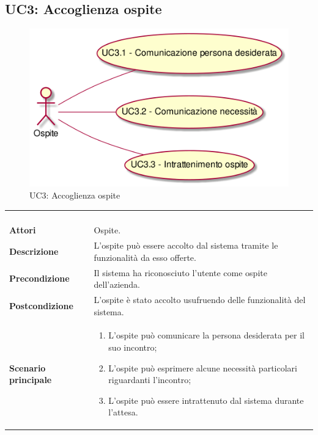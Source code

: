 \newpage\subsection{UC3: Accoglienza ospite}
\label{UC3}
\begin{figure}[h]
\centering
\includegraphics[width=\textwidth,height=\textheight,keepaspectratio]{images/UseCaseUC3.png}
\caption{UC3: Accoglienza ospite}
\end{figure}
\begin{longtable}{l|p{10cm}}
\rowcolor[gray]{0.8} \multicolumn{2}{c}{} \\
\rowcolor[gray]{0.8} \multicolumn{2}{c}{\textbf{UC3 - Accoglienza ospite}} \\
\rowcolor[gray]{0.8} \multicolumn{2}{c}{} \\
\hline
&\\
\textbf{Attori} & Ospite.\\[7pt]
\textbf{Descrizione} & L'ospite può essere accolto dal sistema tramite le funzionalità da esso offerte.\\[7pt]
\textbf{Precondizione} & Il sistema ha riconosciuto l'utente come ospite dell'azienda.\\[7pt]
\textbf{Postcondizione} & L'ospite è stato accolto usufruendo delle funzionalità del sistema.\\[7pt]
\textbf{Scenario principale} &\begin{enumerate}
\item  L'ospite può comunicare la persona desiderata per il suo incontro;
\item  L'ospite può esprimere alcune necessità  particolari riguardanti l'incontro;
\item  L'ospite può essere intrattenuto dal sistema durante l'attesa.
\end{enumerate}
\\[7pt]\hline
\end{longtable}

